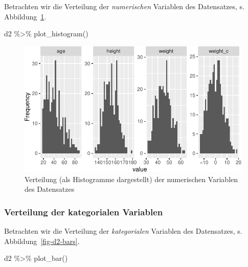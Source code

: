 \documentclass[
  a4paper,
  DIV=11]{scrreprt}
\newenvironment{Shaded}{\begin{snugshade}}{\end{snugshade}}
\newcommand{\FunctionTok}[1]{\textcolor[rgb]{0.28,0.35,0.67}{#1}}
\newcommand{\NormalTok}[1]{\textcolor[rgb]{0.00,0.23,0.31}{#1}}
\newcommand{\SpecialCharTok}[1]{\textcolor[rgb]{0.37,0.37,0.37}{#1}}
\theoremstyle{definition}
\theoremstyle{remark}
\begin{document}
Betrachten wir die Verteilung der \emph{numerischen} Variablen des
Datensatzes, s. Abbildung~\ref{fig-d2-hists}.

\begin{Shaded}
\begin{Highlighting}[]
\NormalTok{d2 }\SpecialCharTok{\%\textgreater{}\%} \FunctionTok{plot\_histogram}\NormalTok{()}
\end{Highlighting}
\end{Shaded}

\begin{figure}[H]

{\centering \includegraphics{./lineare-modelle_files/figure-pdf/fig-d2-hists-1.pdf}

}

\caption{\label{fig-d2-hists}Verteilung (als Histogramme dargestellt)
der numerischen Variablen des Datensatzes}

\end{figure}

\hypertarget{verteilung-der-kategorialen-variablen}{%
\subsubsection{Verteilung der kategorialen
Variablen}\label{verteilung-der-kategorialen-variablen}}

Betrachten wir die Verteilung der \emph{kategorialen} Variablen des
Datensatzes, s. Abbildung~\ref{fig-d2-bars}.

\begin{Shaded}
\begin{Highlighting}[]
\NormalTok{d2 }\SpecialCharTok{\%\textgreater{}\%} \FunctionTok{plot\_bar}\NormalTok{()}
\end{Highlighting}
\end{Shaded}
\end{document}
